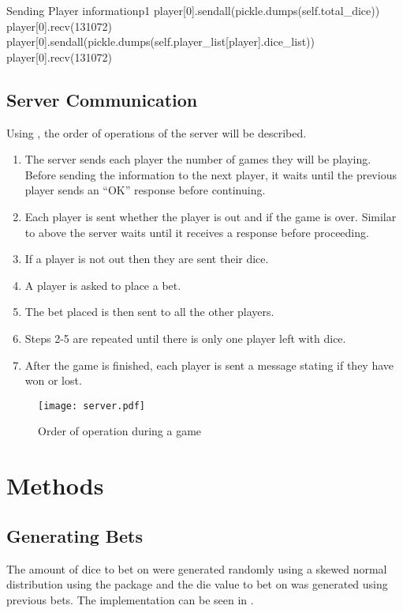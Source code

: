 \begin{myminted}{Sending Player information}{p1}
    player[0].sendall(pickle.dumps(self.total_dice))
    player[0].recv(131072)
    player[0].sendall(pickle.dumps(self.player_list[player].dice_list))
    player[0].recv(131072)
\end{myminted}

\subsection{Server Communication}

Using , the order of operations of the server will be described.

\begin{enumerate}
    \item The server sends each player the number of games they will be playing. Before sending the information to the next player, it waits until the previous player sends an ``OK'' response before continuing.
    \item Each player is sent whether the player is out and if the game is over. Similar to above the server waits until it receives a response before proceeding.
    \item If a player is not out then they are sent their dice.
    \item A player is asked to place a bet.
    \item The bet placed is then sent to all the other players.
    \item Steps 2-5 are repeated until there is only one player left with dice.
    \item After the game is finished, each player is sent a message stating if they have won or lost.
\end{enumerate}

\begin{figure}
    \centering
    \texttt{[image: server.pdf]}
    \caption{Order of operation during a game}
    \label{im:inround}
\end{figure}

\section{Methods}
\label{sec:methods}
\subsection{Generating Bets}

The amount of dice to bet on were generated randomly using a skewed normal distribution using the  package and the die value to bet on was generated using previous bets. The implementation can be seen in .

